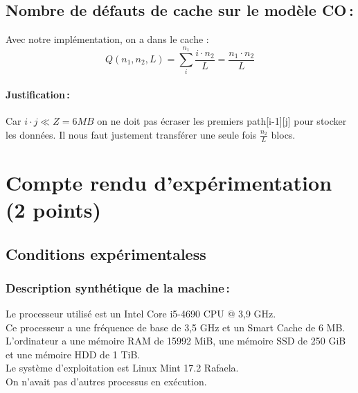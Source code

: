 \documentclass[a4paper, 10pt, french]{article}
\begin{document}
  \subsection{Nombre de défauts de cache sur le modèle CO\,: }
Avec notre implémentation, on a dans le cache :\\
\[
Q(n_1, n_2, L) = \sum^{n_1}_i\frac{i \cdot n_2}{L} = \frac{n_1 \cdot n_2}{L}
\]
    \paragraph{Justification\,: }
    Car $i \cdot j \ll Z = 6 MB$ on ne doit pas écraser les premiers path[i-1][j] pour stocker les données.
     Il nous faut justement transférer une seule fois $\frac{n_2}{L}$ blocs.

\section{Compte rendu d'expérimentation (2 points)}
  \subsection{Conditions expérimentaless}

    \subsubsection{Description synthétique de la machine\,:} 
Le processeur utilisé est un Intel Core i5-4690 CPU @ 3,9 GHz.\\
Ce processeur a une fréquence de base de 3,5 GHz et un Smart Cache de 6 MB.\\
L'ordinateur a une mémoire RAM de 15992 MiB, une mémoire SSD de 250 GiB et une mémoire HDD de 1 TiB.\\
Le système d'exploitation est Linux Mint 17.2 Rafaela.\\
On n'avait pas d'autres processus en exécution.
\end{document}
